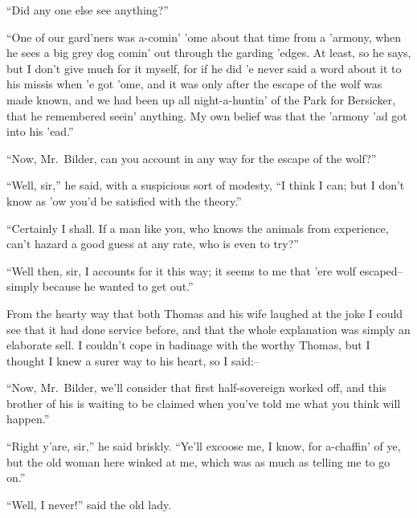 \documentclass[12pt,openright]{book}
\begin{document}
“Did any one else see anything?”

“One of our gard’ners was a-comin’ ’ome about that time from a ’armony, when he sees a big grey dog comin’ out through the garding ’edges. At least, so he says, but I don’t give much for it myself, for if he did ’e never said a word about it to his missis when ’e got ’ome, and it was only after the escape of the wolf was made known, and we had been up all night-a-huntin’ of the Park for Bersicker, that he remembered seein’ anything. My own belief was that the ’armony ’ad got into his ’ead.”

“Now, Mr. Bilder, can you account in any way for the escape of the wolf?”

“Well, sir,” he said, with a suspicious sort of modesty, “I think I can; but I don’t know as ’ow you’d be satisfied with the theory.”

“Certainly I shall. If a man like you, who knows the animals from experience, can’t hazard a good guess at any rate, who is even to try?”

“Well then, sir, I accounts for it this way; it seems to me that ’ere wolf escaped–simply because he wanted to get out.”

From the hearty way that both Thomas and his wife laughed at the joke I could see that it had done service before, and that the whole explanation was simply an elaborate sell. I couldn’t cope in badinage with the worthy Thomas, but I thought I knew a surer way to his heart, so I said:–

“Now, Mr. Bilder, we’ll consider that first half-sovereign worked off, and this brother of his is waiting to be claimed when you’ve told me what you think will happen.”

“Right y’are, sir,” he said briskly. “Ye’ll excoose me, I know, for a-chaffin’ of ye, but the old woman here winked at me, which was as much as telling me to go on.”

“Well, I never!” said the old lady.
\end{document}

